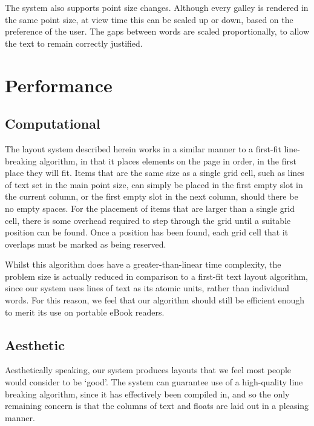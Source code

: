 The system also supports point size changes. Although every galley is rendered in the same point size, at view time this can be scaled up or down, based on the preference of the user. The gaps between words are scaled proportionally, to allow the text to remain correctly justified.




\section{Performance}
\label{sec:performance}

\subsection{Computational}
The layout system described herein works in a similar manner to a first-fit line-breaking algorithm, in that it places elements on the page in order, in the first place they will fit. Items that are the same size as a single grid cell, such as lines of text set in the main point size, can simply be placed in the first empty slot in the current column, or the first empty slot in the next column, should there be no empty spaces.  For the placement of items that are larger than a single grid cell, there is some overhead required to step through the grid until a suitable position can be found. Once a position has been found, each grid cell that it overlaps must be marked as being reserved.

Whilst this algorithm does have a greater-than-linear time complexity, the problem size is actually reduced in comparison to a first-fit text layout algorithm, since our system uses lines of text as its atomic units, rather than individual words. For this reason, we feel that our algorithm should still be efficient enough to merit its use on portable eBook readers.



\subsection{Aesthetic}
Aesthetically speaking, our system produces layouts that we feel most people would consider to be `good'. The system can guarantee use of a high-quality line breaking algorithm, since it has effectively been compiled in, and so the only remaining concern is that the columns of text and floats are laid out in a pleasing manner.

